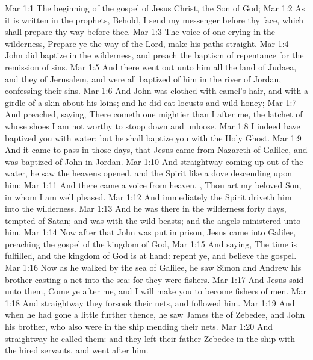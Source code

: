 \vs Mar 1:1 The beginning of the gospel of Jesus Christ, the Son of God;
\vs Mar 1:2 As it is written in the prophets, Behold, I send my messenger before thy face, which shall prepare thy way before thee.
\vs Mar 1:3 The voice of one crying in the wilderness, Prepare ye the way of the Lord, make his paths straight.
\vs Mar 1:4 John did baptize in the wilderness, and preach the baptism of repentance for the remission of sins.
\vs Mar 1:5 And there went out unto him all the land of Judaea, and they of Jerusalem, and were all baptized of him in the river of Jordan, confessing their sins.
\vs Mar 1:6 And John was clothed with camel's hair, and with a girdle of a skin about his loins; and he did eat locusts and wild honey;
\vs Mar 1:7 And preached, saying, There cometh one mightier than I after me, the latchet of whose shoes I am not worthy to stoop down and unloose.
\vs Mar 1:8 I indeed have baptized you with water: but he shall baptize you with the Holy Ghost.
\vs Mar 1:9 And it came to pass in those days, that Jesus came from Nazareth of Galilee, and was baptized of John in Jordan.
\vs Mar 1:10 And straightway coming up out of the water, he saw the heavens opened, and the Spirit like a dove descending upon him:
\vs Mar 1:11 And there came a voice from heaven, , Thou art my beloved Son, in whom I am well pleased.
\vs Mar 1:12 And immediately the Spirit driveth him into the wilderness.
\vs Mar 1:13 And he was there in the wilderness forty days, tempted of Satan; and was with the wild beasts; and the angels ministered unto him.
\vs Mar 1:14 Now after that John was put in prison, Jesus came into Galilee, preaching the gospel of the kingdom of God,
\vs Mar 1:15 And saying, The time is fulfilled, and the kingdom of God is at hand: repent ye, and believe the gospel.
\vs Mar 1:16 Now as he walked by the sea of Galilee, he saw Simon and Andrew his brother casting a net into the sea: for they were fishers.
\vs Mar 1:17 And Jesus said unto them, Come ye after me, and I will make you to become fishers of men.
\vs Mar 1:18 And straightway they forsook their nets, and followed him.
\vs Mar 1:19 And when he had gone a little further thence, he saw James the  of Zebedee, and John his brother, who also were in the ship mending their nets.
\vs Mar 1:20 And straightway he called them: and they left their father Zebedee in the ship with the hired servants, and went after him.
